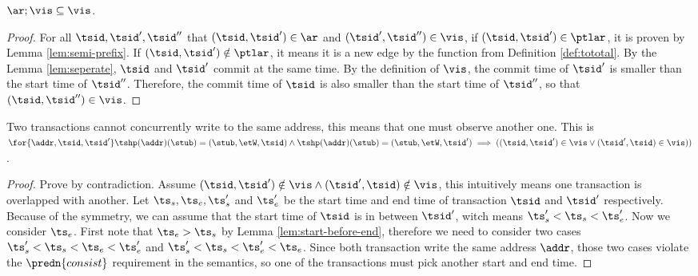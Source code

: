 \begin{lem}[Prefix]
    \label{lem:prefix}
    \( \ar; \vis \subseteq \vis \).
\end{lem}
\begin{proof}
    For all \( \tsid, \tsid', \tsid'' \) that \( (\tsid, \tsid') \in \ar \) and \( (\tsid', \tsid'') \in \vis \), if \( (\tsid, \tsid') \in \ptlar \), it is proven by Lemma \ref{lem:semi-prefix}.
    If \( ( \tsid, \tsid' ) \notin \ptlar \), it means it is a new edge by the  function from Definition \ref{def:tototal}.
    By the Lemma \ref{lem:seperate}, \( \tsid \) and \( \tsid' \) commit at the same time.
    By the definition of \( \vis \), the commit time of \( \tsid' \) is smaller than the start time of \( \tsid'' \).
    Therefore, the commit time of \( \tsid \) is also smaller than the start time of \( \tsid'' \), so that \( ( \tsid, \tsid'' ) \in \vis \).
\end{proof}

\begin{lem}[No conflict]
    \label{lem:nocoflict}
    Two transactions cannot concurrently write to the same address, this means that one must observe another one.
    This is \( \for{ \addr, \tsid, \tsid' } \tshp(\addr)(\stub) = (\stub, \etW, \tsid) \land  \tshp(\addr)(\stub) = (\stub, \etW, \tsid' ) \implies ((\tsid, \tsid') \in \vis \lor (\tsid', \tsid) \in \vis ))\).
\end{lem}
\begin{proof}
    Prove by contradiction.
    Assume \( (\tsid, \tsid') \notin \vis \land (\tsid', \tsid) \notin \vis \), this intuitively means one transaction is overlapped with another.
    Let \( \ts_{s}, \ts_{e}, \ts'_{s} \) and \( \ts'_{e} \) be the start time and end time of transaction \( \tsid \) and \( \tsid' \) respectively.
    Because of the symmetry,  we can assume that the start time of \( \tsid \) is in between \( \tsid' \), witch means \( \ts'_{s} < \ts_{s} < \ts'_{e} \).
    Now we consider \( \ts_{e} \).
    First note that \( \ts_{e} > \ts_{s} \) by Lemma \ref{lem:start-before-end}, therefore we need to consider two cases \( \ts'_{s} < \ts_{s} < \ts_{e} < \ts'_{e} \) and  \( \ts'_{s} < \ts_{s} < \ts'_{e} < \ts_{e}  \).
    Since both transaction write the same address \( \addr \), those two cases violate the \( \predn{consist} \) requirement in the semantics, so one of the transactions must pick another start and end time.
\end{proof}

